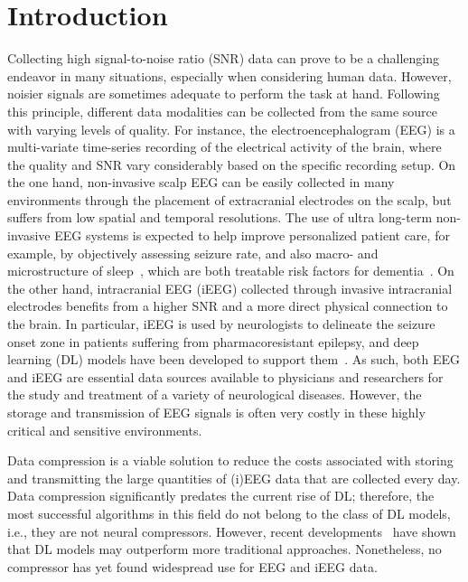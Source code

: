 \documentclass{article} %
\begin{document}
\section{Introduction}
Collecting high signal-to-noise ratio (SNR) data can prove to be a challenging endeavor in many situations, especially when considering human data.
However, noisier signals are sometimes adequate to perform the task at hand.
Following this principle, different data modalities can be collected from the same source with varying levels of quality.
For instance, the electroencephalogram (EEG) is a multi-variate time-series recording of the electrical activity of the brain, where the quality and SNR vary considerably based on the specific recording setup. 
On the one hand, non-invasive scalp EEG can be easily collected in many environments through the placement of extracranial electrodes on the scalp, but suffers from low spatial and temporal resolutions. The use of ultra long-term non-invasive EEG systems is expected to help improve personalized patient care, for example, by objectively assessing seizure rate, and also macro- and microstructure of sleep~\citep{Yilmaz2024, Casson2010}, which are both treatable risk factors for dementia~\citep{Hanke2022}.
On the other hand, intracranial EEG (iEEG) collected through invasive intracranial electrodes benefits from a higher SNR and a more direct physical connection to the brain. In particular, iEEG is used by neurologists to delineate the seizure onset zone in patients suffering from pharmacoresistant epilepsy, and deep learning (DL) models have been developed to support them~\citep{Kuhlmann2018, Craik2019}. 
As such, both EEG and iEEG are essential data sources available to physicians and researchers for the study and treatment of a variety of neurological diseases.
However, the storage and transmission of EEG signals is often very costly in these highly critical and sensitive environments. 

Data compression is a viable solution to reduce the costs associated with storing and transmitting the large quantities of (i)EEG data that are collected every day.
Data compression significantly predates the current rise of DL; therefore, the most successful algorithms in this field do not belong to the class of DL models, i.e., they are not neural compressors.
However, recent developments~\citep{Dani2021, Webex2022, Defossez2023} have shown that DL models may outperform more traditional approaches.
Nonetheless, no compressor has yet found widespread use for EEG and iEEG data.
\end{document}
